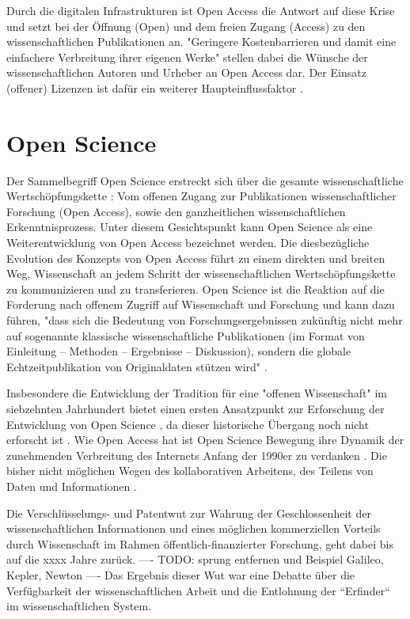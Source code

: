 Durch die digitalen Infrastrukturen ist Open Access die Antwort auf diese Krise und setzt bei der Öffnung (Open) und dem freien Zugang (Access) zu den wissenschaftlichen Publikationen an. "Geringere Kostenbarrieren und damit eine einfachere Verbreitung ihrer eigenen Werke" \cite{WD_bundestag_2009} stellen dabei die Wünsche der wissenschaftlichen Autoren und Urheber an Open Access dar. Der Einsatz (offener) Lizenzen ist dafür ein weiterer Haupteinflussfaktor \cite{cite:16}. 

\section{Open Science}
Der Sammelbegriff Open Science erstreckt sich über die gesamte wissenschaftliche Wertschöpfungskette \cite{Scheliga_2014}: Vom offenen Zugang zur Publikationen wissenschaftlicher Forschung (Open Access), sowie den ganzheitlichen wissenschaftlichen Erkenntnisprozess. Unter diesem Gesichtspunkt kann Open Science als eine Weiterentwicklung von Open Access bezeichnet werden. Die diesbezügliche Evolution des Konzepts von Open Access führt zu einem direkten und breiten Weg, Wissenschaft an jedem Schritt der wissenschaftlichen Wertschöpfungskette zu kommunizieren und zu transferieren. Open Science ist die Reaktion auf die Forderung nach offenem Zugriff auf Wissenschaft und Forschung und kann dazu führen, "dass sich die Bedeutung von Forschungsergebnissen zukünftig nicht mehr auf sogenannte klassische wissenschaftliche Publikationen (im Format von Einleitung – Methoden – Ergebnisse – Diskussion), sondern die globale Echtzeitpublikation von Originaldaten stützen wird" \cite{Stengel_2013}.

Insbesondere die Entwicklung der Tradition für eine "offenen Wissenschaft" im siebzehnten Jahrhundert bietet einen ersten Ansatzpunkt zur Erforschung der Entwicklung von Open Science \cite{Scheliga_2014}, da dieser historische Übergang noch nicht erforscht ist \cite{CREATe_2014}. Wie Open Access hat ist Open Science Bewegung ihre Dynamik der zunehmenden Verbreitung des Internets Anfang der 1990er zu verdanken \cite{Lievrouw_2010}. Die bisher nicht möglichen Wegen des kollaborativen Arbeitens, des Teilens von Daten und Informationen \cite{Meyer_2013}.

Die Verschlüsselungs- und Patentwut zur Wahrung der Geschlossenheit der wissenschaftlichen Informationen und eines möglichen kommerziellen Vorteils durch Wissenschaft im Rahmen öffentlich-finanzierter Forschung, geht dabei bis auf die xxxx Jahre zurück. ---- TODO: sprung entfernen und Beispiel Galileo, Kepler, Newton ----  Das Ergebnis dieser Wut war eine Debatte über die Verfügbarkeit der wissenschaftlichen Arbeit und die Entlohnung der “Erfinder“ im wissenschaftlichen System.

